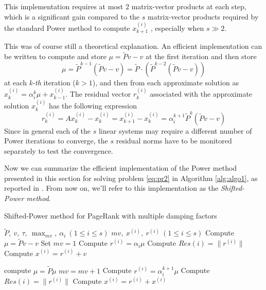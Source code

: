 This implementation requires at most $2$ matrix-vector products at each step, which is a significant gain compared to the $s$ matrix-vector products required by the standard Power method to compute $x^{(i)}_{k+1}$ , especially when $s \gg 2$. \vspace{0.4cm}

\noindent This was of course still a theoretical explanation. An efficient implementation can be written to compute and store $\mu = \tilde Pv -v$ at the first iteration and then store
$$\mu = \tilde P^{k-1}(\tilde P v - v) = \tilde P \cdot (\tilde P^{k-2}(\tilde P v - v))$$
at each \emph{k-th} iteration ($k  > 1$), and then from each approximate solution as $x_k^{(i)} = \alpha_i^k \mu + x_{k-1}^{(i)}$. The residual vector $r_k^{(i)}$ associated with the approximate solution $x_k^{(i)}$ has the following expression
\begin{equation}
    r_k^{(i)} = A x_k^{(i)} - x_k^{(i)} = x_{k+1}^{(i)} - x_k^{(i)} = \alpha_i^{k+1} \tilde P^k (\tilde P v - v)
\end{equation}
Since in general each of the $s$ linear systems may require a different number of Power iterations to converge, the $s$ residual norms have to be monitored separately to test the convergence. \vspace{0.4cm}

\noindent Now we can summarize the efficient implementation of the Power method presented in this section for solving problem \ref{eq:pr2} in Algorithm \ref{alg:algo1}, as reported in \cite{SHEN2022126799}. From now on, we'll refer to this implementation as the \emph{Shifted-Power method}.

\begin{algorithm}\label{alg:algo1}
    \caption{Shifted-Power method for PageRank with multiple damping factors}\label{alg:algo1}
    \begin{algorithmic}
        \Require $\tilde P, ~v, ~\tau, ~\max_{mv}, ~\alpha_i ~ (1 \leq i \leq s)$
        \Ensure $mv,~ x^{(i)},~ r^{(i)} ~ (1 \leq i \leq s)$
        \State Compute $\mu = \tilde P v - v$
        \State Set $mv =1$
            \State Compute $r^{(i)} = \alpha_i \mu$
            \State Compute $Res(i) = \lVert r^{(i)} \rVert$
                \State Compute $x^{(i)} = r^{(i)} + v$
            \EndIf
        \EndFor

            \State compute $\mu = \tilde P \mu$
            \State $mv = mv + 1$
                    \State Compute $r^{(i)} = \alpha_i^{k+1} \mu$
                    \State Compute $Res(i) = \lVert r^{(i)} \rVert$
                        \State Compute $x^{(i)} = r^{(i)} + x^{(i)}$
                    \EndIf
                \EndIf
            \EndFor
        \EndWhile
    \end{algorithmic}
\end{algorithm}

